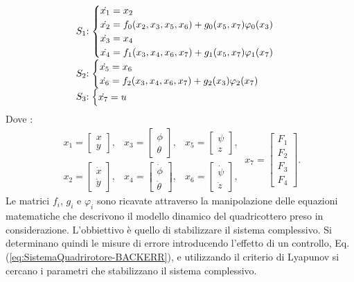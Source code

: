 \begin{equation}\label{eq:SistemaQuadrirotore_BACKSis}
\begin{array}{r@{}l}
	S_1 &:
	\begin{cases}
	\dot{x_1} = x_2 \\ \dot{x_2} = f_0(x_2,x_3,x_5,x_6) + g_0(x_5,x_7)\varphi_0(x_3) \\ \dot{x_3}=x_4 \\ \dot{x_4} = f_1(x_3,x_4,x_6,x_7) + g_1(x_5,x_7)\varphi_1(x_7)
	\end{cases} \\ 
		S_2 &:
	\begin{cases}
	\dot{x_5} = x_6 \\ \dot{x_6} = f_2(x_3,x_4,x_6,x_7) + g_2(x_3) \varphi_2(x_7)
	\end{cases} \\
		S_3 &:
	\begin{cases}
	\dot{x_7}=u
	\end{cases}
\end{array}
\end{equation}
Dove :
\[
\begin{matrix}
x_1 = \begin{bmatrix}
x \\ y
\end{bmatrix}, &
x_3 = \begin{bmatrix}
\phi \\ \theta
\end{bmatrix}, &
x_5 = \begin{bmatrix}
\psi \\ z
\end{bmatrix}, \\
x_2 = \begin{bmatrix}
\dot{x} \\ \dot{y}
\end{bmatrix}, &
x_4 = \begin{bmatrix}
\dot{\phi} \\ \dot{\theta}
\end{bmatrix}, &
x_6 = \begin{bmatrix}
\dot{\psi} \\ \dot{z}
\end{bmatrix},
\end{matrix} \ 
x_7 = \begin{bmatrix}
F_1 \\ F_2 \\ F_3 \\ F_4
\end{bmatrix}.
\]
Le matrici $f_i$, $g_i$ e $\varphi_i$ sono ricavate attraverso la manipolazione delle equazioni matematiche che descrivono il modello dinamico del quadricottero preso in considerazione.
L'obbiettivo è quello di stabilizzare il sistema complessivo. Si determinano quindi le misure di errore introducendo l'effetto di un controllo, Eq. (\ref{eq:SistemaQuadrirotore-BACKERR}), e utilizzando il criterio di Lyapunov si cercano i parametri che stabilizzano il sistema complessivo. 

